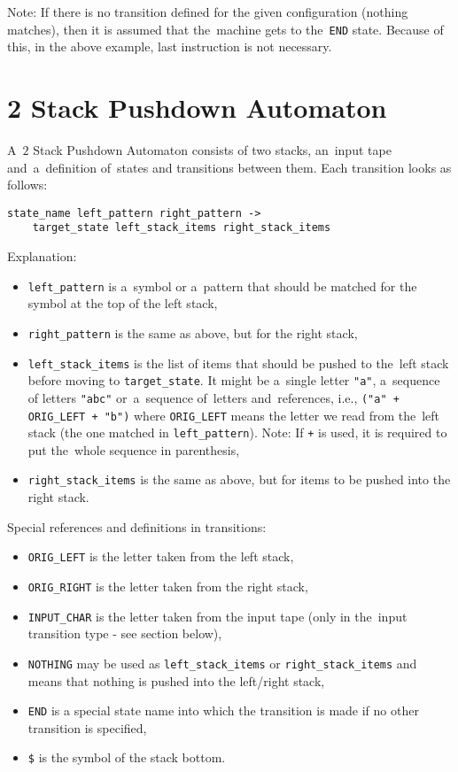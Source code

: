 \documentclass[english,shortabstract,mgr]{iithesis}
\begin{document}
Note: If there is no transition defined for the given configuration
(nothing matches), then it is assumed that the~machine gets to the~\texttt{END} state.
Because of this, in the above example, last instruction is not necessary.

\section {2 Stack Pushdown Automaton}

A~$2$ Stack Pushdown Automaton consists of two stacks, an~input tape and~a~definition
of~states and transitions between them. Each transition looks as follows:
\begin{verbatim}
state_name left_pattern right_pattern ->
    target_state left_stack_items right_stack_items
\end{verbatim}

Explanation:
\begin{itemize}
  \item \texttt{left\_pattern} is a~symbol or a~pattern that should be matched
      for the symbol at the top of the left stack,
  \item \texttt{right\_pattern} is the same as above, but for the right stack,
  \item \texttt{left\_stack\_items} is the list of items that should be pushed
      to the~left stack before moving to \texttt{target\_state}. It might be
      a~single letter \texttt{"a"}, a~sequence of letters \texttt{"abc"}
      or~a~sequence of~letters and~references, i.e., \texttt{("a" + ORIG\_LEFT + "b")}
      where \texttt{ORIG\_LEFT} means the letter we read from the~left stack (the one matched
      in \texttt{left\_pattern}). Note: If \texttt{+} is used, it is required to put
      the~whole sequence in parenthesis,
  \item \texttt{right\_stack\_items} is the same as above, but for items to be pushed into
      the right stack.
\end{itemize}

Special references and definitions in transitions:
\begin{itemize}
  \item \texttt{ORIG\_LEFT} is the letter taken from the left stack,
  \item \texttt{ORIG\_RIGHT} is the letter taken from the right stack,
  \item \texttt{INPUT\_CHAR} is the letter taken from the input tape
      (only in the~input transition type - see section below),
  \item \texttt{NOTHING} may be used as \texttt{left\_stack\_items} or \texttt{right\_stack\_items}
      and means that nothing is pushed into the left/right stack,
  \item \texttt{END} is a special state name into which the transition is made if no other transition is specified,
  \item \texttt{\$} is the symbol of the stack bottom.
\end{itemize}
\end{document}
